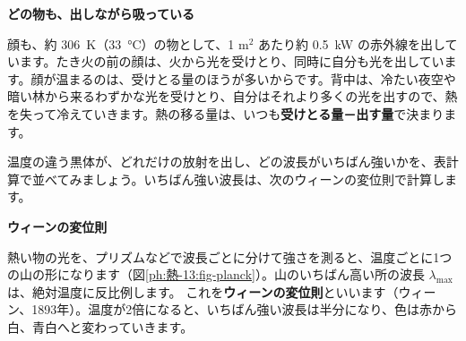 \noindent\textbf{どの物も、出しながら吸っている}\par\nobreak
顔も、約 \qty{306}{K}（\qty{33}{\celsius}）の物として、1 m$^2$ あたり約 \qty{0.5}{kW} の赤外線を出しています。たき火の前の顔は、火から光を受けとり、同時に自分も光を出しています。顔が温まるのは、受けとる量のほうが多いからです。背中は、冷たい夜空や暗い林から来るわずかな光を受けとり、自分はそれより多くの光を出すので、熱を失って冷えていきます。熱の移る量は、いつも\textbf{受けとる量－出す量}で決まります。



\leavevmode\label{ph:熱-13:sec3}温度の違う黒体が、どれだけの放射を出し、どの波長がいちばん強いかを、表計算で並べてみましょう。いちばん強い波長は、次のウィーンの変位則で計算します。

\noindent\textbf{ウィーンの変位則}\par\nobreak
熱い物の光を、プリズムなどで波長ごとに分けて強さを測ると、温度ごとに1つの山の形になります（図\ref{ph:熱-13:fig-planck}）。山のいちばん高い所の波長 $\lambda_{\max}$ は、絶対温度に反比例します。
\label{ph:熱-13:wien}これを\textbf{ウィーンの変位則}といいます（ウィーン、1893年）。温度が2倍になると、いちばん強い波長は半分になり、色は赤から白、青白へと変わっていきます。

